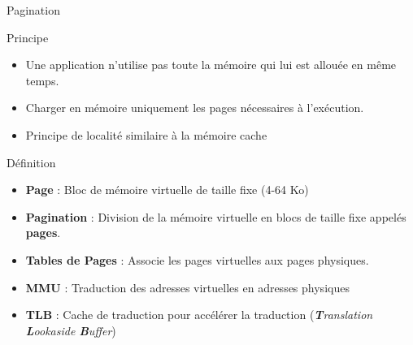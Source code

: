 \documentclass[8pt]{beamer}
\begin{document}
\begin{frame}{Pagination}
    \begin{block}{Principe}
        \begin{itemize}
            \item Une application n'utilise pas toute la mémoire qui lui est
                  allouée en même
                  temps.
            \item Charger en mémoire uniquement les pages nécessaires à
                  l'exécution.
            \item Principe de localité similaire \`a la m\'emoire cache
        \end{itemize}

    \end{block}
    \begin{block}{D\'efinition}
        \begin{itemize}
            \item \textbf{Page} : Bloc de mémoire virtuelle de taille fixe
                  (4-64 Ko)
            \item \textbf{Pagination} : Division de la mémoire virtuelle en
                  blocs de taille fixe appelés
                  \textbf{pages}.
            \item \textbf{Tables de Pages} : Associe les pages
                  virtuelles aux pages physiques.
            \item \textbf{MMU} : Traduction des adresses virtuelles en
                  adresses physiques
            \item \textbf{TLB} : Cache de traduction pour accélérer la
                  traduction (\emph{\textbf{T}ranslation \textbf{L}ookaside
                      \textbf{B}uffer})
        \end{itemize}
    \end{block}
\end{frame}
\end{document}
